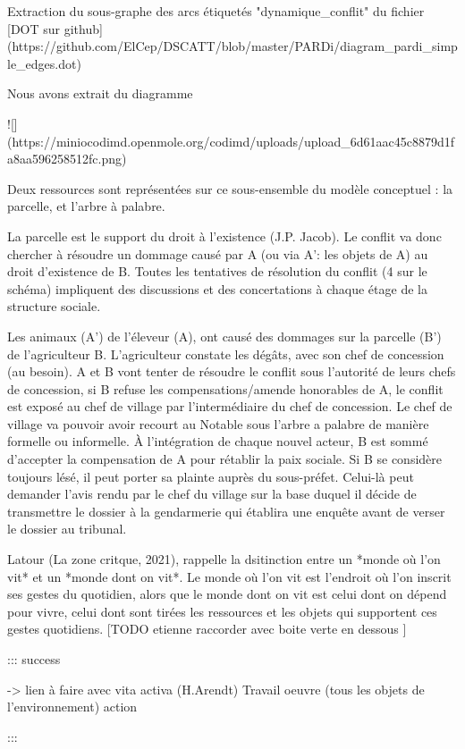 Extraction du sous-graphe des arcs étiquetés  "dynamique_conflit" du fichier [DOT sur github](https://github.com/ElCep/DSCATT/blob/master/PARDi/diagram_pardi_simple_edges.dot)

Nous avons extrait du diagramme 

![](https://miniocodimd.openmole.org/codimd/uploads/upload_6d61aac45c8879d1fa8aa596258512fc.png)

Deux ressources sont représentées sur ce sous-ensemble du modèle conceptuel : la parcelle, et l'arbre à palabre. 

La parcelle est le support du droit à l'existence (J.P. Jacob). Le conflit va donc chercher à résoudre un dommage causé par A (ou via A': les objets de A) au droit d'existence de B. Toutes les tentatives de résolution du conflit (4 sur le schéma) impliquent des discussions et des concertations à chaque étage de la structure sociale.

Les animaux (A') de l'éleveur (A), ont causé des dommages sur la parcelle (B') de l'agriculteur B. L'agriculteur constate les dégâts, avec son chef de concession (au besoin). A et B vont tenter de résoudre le conflit sous l'autorité de leurs chefs de concession, si B refuse les compensations/amende honorables de A, le conflit est exposé au chef de village par l'intermédiaire du chef de concession. Le chef de village va pouvoir avoir recourt au Notable sous l'arbre a palabre de manière formelle ou informelle. À l'intégration de chaque nouvel acteur, B est sommé d'accepter la compensation de A pour rétablir la paix sociale. Si B se considère toujours lésé, il peut porter sa plainte auprès du sous-préfet. Celui-là peut demander l'avis rendu par le chef du village sur la base duquel il décide de transmettre le dossier à la gendarmerie qui établira une enquête avant de verser le dossier au tribunal. 

Latour (La zone critque, 2021), rappelle la dsitinction entre  un *monde où l'on vit* et un *monde dont on vit*. Le monde où l'on vit  est l'endroit où l'on inscrit ses gestes du quotidien, alors que le monde dont on vit est  celui dont on dépend pour vivre, celui dont sont tirées les ressources et les objets qui supportent ces gestes quotidiens. [TODO etienne raccorder avec boite verte en dessous ]

::: success

 -> lien à faire avec vita activa (H.Arendt)
Travail 
oeuvre (tous les objets de l'environnement) 
action 

:::



